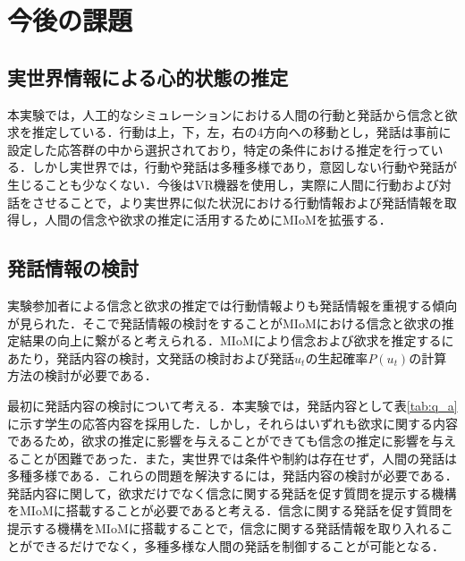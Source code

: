 \chapter{今後の課題}

\section{実世界情報による心的状態の推定}
本実験では，人工的なシミュレーションにおける人間の行動と発話から信念と欲求を推定している．行動は上，下，左，右の4方向への移動とし，発話は事前に設定した応答群の中から選択されており，特定の条件における推定を行っている．しかし実世界では，行動や発話は多種多様であり，意図しない行動や発話が生じることも少なくない．今後はVR機器を使用し，実際に人間に行動および対話をさせることで，より実世界に似た状況における行動情報および発話情報を取得し，人間の信念や欲求の推定に活用するためにMIoMを拡張する．

\section{発話情報の検討}

\par
実験参加者による信念と欲求の推定では行動情報よりも発話情報を重視する傾向が見られた．そこで発話情報の検討をすることがMIoMにおける信念と欲求の推定結果の向上に繋がると考えられる．MIoMにより信念および欲求を推定するにあたり，発話内容の検討，文発話の検討および発話$u_t$の生起確率$P(u_t)$の計算方法の検討が必要である．

\par
最初に発話内容の検討について考える．本実験では，発話内容として表\ref{tab:q_a}に示す学生の応答内容を採用した．しかし，それらはいずれも欲求に関する内容であるため，欲求の推定に影響を与えることができても信念の推定に影響を与えることが困難であった．また，実世界では条件や制約は存在せず，人間の発話は多種多様である．これらの問題を解決するには，発話内容の検討が必要である．発話内容に関して，欲求だけでなく信念に関する発話を促す質問を提示する機構をMIoMに搭載することが必要であると考える．信念に関する発話を促す質問を提示する機構をMIoMに搭載することで，信念に関する発話情報を取り入れることができるだけでなく，多種多様な人間の発話を制御することが可能となる．

